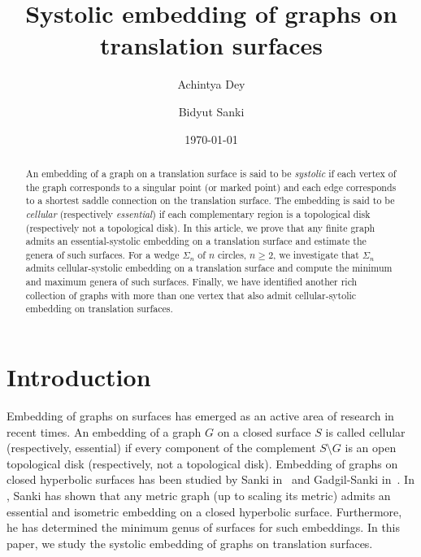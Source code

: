 \documentclass[11pt]{amsart}
\title{ Systolic embedding of graphs on translation  surfaces}
\author{Achintya Dey}
\author{Bidyut Sanki}
\date{\today}
\theoremstyle{plain}
\theoremstyle{definition}
\theoremstyle{remark}
\numberwithin{equation}{section}
\numberwithin{figure}{section}
\begin{document}
\begin{abstract}
An embedding of a graph on a translation surface is said to be \emph{systolic} if each vertex of the graph corresponds to a singular point (or marked point) and each edge corresponds to a shortest saddle connection on the translation surface. The embedding is said to be \emph{cellular} (respectively \emph{essential}) if each complementary region is a topological disk (respectively not a topological disk). In this article, we prove that any finite graph admits an essential-systolic embedding on a translation surface and estimate the genera of such surfaces. For a wedge $\Sigma_n$ of $n$ circles, $n\geq2$, we investigate that $\Sigma_n$ admits cellular-systolic embedding on a translation surface and compute the minimum and maximum genera of such surfaces. Finally, we have identified another rich collection of graphs with more than one vertex that also admit cellular-sytolic embedding on translation surfaces.
\end{abstract}
\maketitle {}
\section{Introduction}
Embedding of graphs on surfaces has emerged as an active area of research in recent times. An embedding of a graph $G$ on a closed surface $S$ is called cellular (respectively, essential) if every component of the complement $S\setminus G$ is an open topological disk (respectively, not a topological disk). Embedding of graphs on closed hyperbolic surfaces has been studied by Sanki in~\cite{sa19} and Gadgil-Sanki in~\cite{san19}. In \cite{sa19}, Sanki has shown that any metric graph (up to scaling its metric) admits an essential and isometric embedding on a closed hyperbolic surface. Furthermore, he has determined the minimum genus of surfaces for such embeddings. In this paper, we study the systolic embedding of graphs on translation surfaces.
\end{document}
